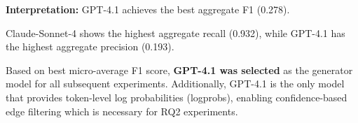 \begin{table}[H]
\begin{threeparttable}
\begin{tablenotes}
\item \textbf{Interpretation:} GPT-4.1 achieves the best aggregate F1 (0.278).
\item Claude-Sonnet-4 shows the highest aggregate recall (0.932), while GPT-4.1 has the highest aggregate precision (0.193).
\item Based on best micro-average F1 score, \textbf{GPT-4.1 was selected} as the generator model for all subsequent experiments. Additionally, GPT-4.1 is the only model that provides token-level log probabilities (logprobs), enabling confidence-based edge filtering which is necessary for RQ2 experiments.
\end{tablenotes}
\end{threeparttable}
\end{table}